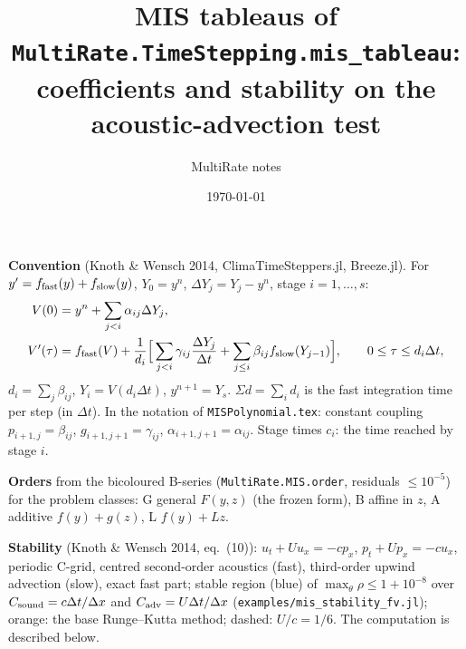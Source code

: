 \documentclass[11pt,a4paper]{article}
\title{MIS tableaus of \texttt{MultiRate.TimeStepping.mis\_tableau}:\\coefficients and stability on the acoustic-advection test}
\author{MultiRate notes}
\date{\today}
\begin{document}
\sloppy
\maketitle
\noindent\textbf{Convention} (Knoth \& Wensch 2014, ClimaTimeSteppers.jl, Breeze.jl). For $y'=f_{\rm fast}(y)+f_{\rm slow}(y)$,
$Y_0=y^n$, $\Delta Y_j=Y_j-y^n$, stage $i=1,\dots,s$:
\begin{align*}
V(0)&=y^n+\sum_{j<i}\alpha_{ij}\Delta Y_j,\\
V'(\tau)&=f_{\rm fast}(V)+\frac1{d_i}\Big[\sum_{j<i}\gamma_{ij}\frac{\Delta Y_j}{\Delta t}+\sum_{j\le i}\beta_{ij}f_{\rm slow}(Y_{j-1})\Big],\qquad
0\le\tau\le d_i\Delta t,
\end{align*}
$d_i=\sum_j\beta_{ij}$, $Y_i=V(d_i\Delta t)$, $y^{n+1}=Y_s$. $\Sigma d=\sum_id_i$ is the fast integration time per step (in $\Delta t$).
In the notation of \texttt{MISPolynomial.tex}: constant coupling $p_{i+1,j}=\beta_{ij}$, $g_{i+1,j+1}=\gamma_{ij}$,
$\alpha_{i+1,j+1}=\alpha_{ij}$. Stage times $c_i$: the time reached by stage $i$.

\noindent\textbf{Orders} from the bicoloured B-series (\texttt{MultiRate.MIS.order}, residuals $\le10^{-5}$) for the problem
classes: G general $F(y,z)$ (the frozen form), B affine in $z$, A additive $f(y)+g(z)$, L $f(y)+Lz$.

\noindent\textbf{Stability} (Knoth \& Wensch 2014, eq.~(10)): $u_t+Uu_x=-cp_x$, $p_t+Up_x=-cu_x$, periodic C-grid, centred
second-order acoustics (fast), third-order upwind advection (slow), exact fast part; stable region (blue) of
$\max_\theta\rho\le1+10^{-8}$ over $C_{\rm sound}=c\Delta t/\Delta x$ and $C_{\rm adv}=U\Delta t/\Delta x$
(\texttt{examples/mis\_stability\_fv.jl}); orange: the base Runge--Kutta method; dashed: $U/c=1/6$. The computation is
described below.
\end{document}
